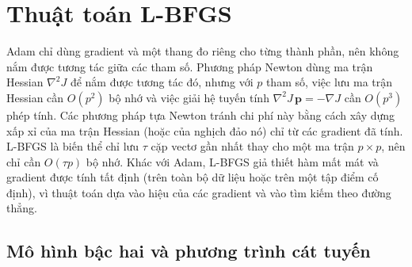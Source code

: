 %

\section{Thuật toán L-BFGS}
\label{sec:lbfgs}

Adam chỉ dùng gradient và một thang đo riêng cho từng thành phần, nên không nắm được tương tác giữa các tham số. Phương pháp Newton dùng ma trận Hessian $\nabla^2J$ để nắm được tương tác đó, nhưng với $p$ tham số, việc lưu ma trận Hessian cần $O(p^2)$ bộ nhớ và việc giải hệ tuyến tính $\nabla^2J\,\mathbf{p}=-\nabla J$ cần $O(p^3)$ phép tính. Các phương pháp tựa Newton tránh chi phí này bằng cách xây dựng xấp xỉ của ma trận Hessian (hoặc của nghịch đảo nó) chỉ từ các gradient đã tính. L-BFGS là biến thể chỉ lưu $\tau$ cặp vectơ gần nhất thay cho một ma trận $p\times p$, nên chỉ cần $O(\tau p)$ bộ nhớ. Khác với Adam, L-BFGS giả thiết hàm mất mát và gradient được tính tất định (trên toàn bộ dữ liệu hoặc trên một tập điểm cố định), vì thuật toán dựa vào hiệu của các gradient và vào tìm kiếm theo đường thẳng.

\subsection{Mô hình bậc hai và phương trình cát tuyến}

